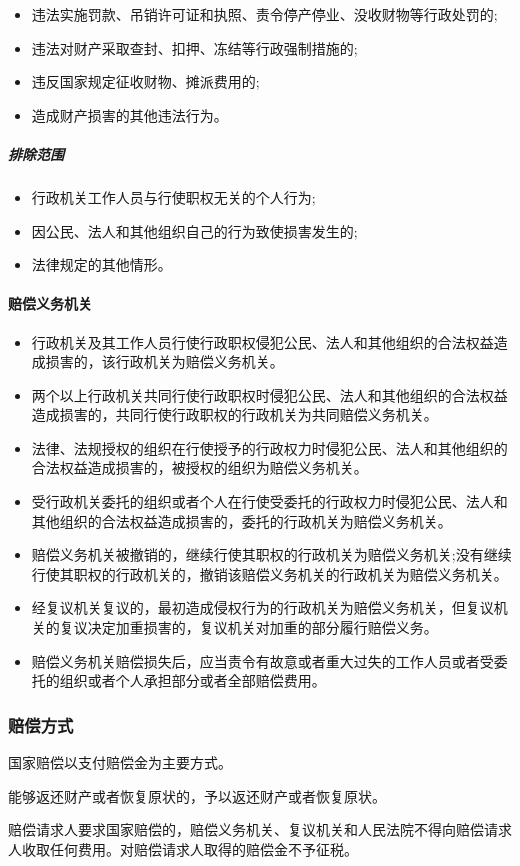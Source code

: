 \begin{itemize}
	\item 违法实施罚款、吊销许可证和执照、责令停产停业、没收财物等行政处罚的;
	\item 违法对财产采取查封、扣押、冻结等行政强制措施的;
	\item 违反国家规定征收财物、摊派费用的;
	\item 造成财产损害的其他违法行为。
\end{itemize}

\subparagraph{排除范围}

\begin{itemize}
	\item 行政机关工作人员与行使职权无关的个人行为;
	\item 因公民、法人和其他组织自己的行为致使损害发生的;
	\item 法律规定的其他情形。
\end{itemize}

\paragraph{赔偿义务机关}

\begin{itemize}
	\item 行政机关及其工作人员行使行政职权侵犯公民、法人和其他组织的合法权益造成损害的，该行政机关为赔偿义务机关。
	\item 两个以上行政机关共同行使行政职权时侵犯公民、法人和其他组织的合法权益造成损害的，共同行使行政职权的行政机关为共同赔偿义务机关。
	\item 法律、法规授权的组织在行使授予的行政权力时侵犯公民、法人和其他组织的合法权益造成损害的，被授权的组织为赔偿义务机关。
	\item 受行政机关委托的组织或者个人在行使受委托的行政权力时侵犯公民、法人和其他组织的合法权益造成损害的，委托的行政机关为赔偿义务机关。
	\item 赔偿义务机关被撤销的，继续行使其职权的行政机关为赔偿义务机关;没有继续行使其职权的行政机关的，撤销该赔偿义务机关的行政机关为赔偿义务机关。
	\item 经复议机关复议的，最初造成侵权行为的行政机关为赔偿义务机关，但复议机关的复议决定加重损害的，复议机关对加重的部分履行赔偿义务。
	\item 赔偿义务机关赔偿损失后，应当责令有故意或者重大过失的工作人员或者受委托的组织或者个人承担部分或者全部赔偿费用。
\end{itemize}

\subsubsection{赔偿方式} 国家赔偿以支付赔偿金为主要方式。

能够返还财产或者恢复原状的，予以返还财产或者恢复原状。

赔偿请求人要求国家赔偿的，赔偿义务机关、复议机关和人民法院不得向赔偿请求人收取任何费用。对赔偿请求人取得的赔偿金不予征税。



